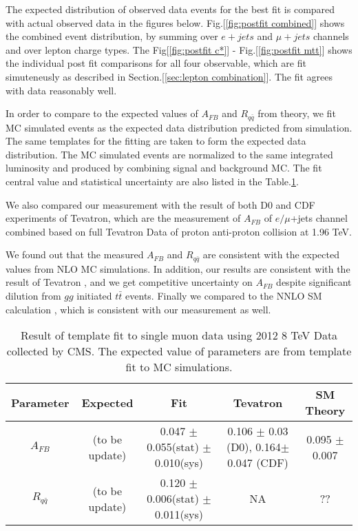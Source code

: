 \documentclass{cmspaperpdf}
\begin{document}
The expected distribution of observed data events for the best fit is compared with actual observed data in the figures below. Fig.[\ref{fig:postfit combined}] shows the combined event distribution, by summing over $e+jets$ and $\mu+jets$ channels and over lepton charge types. The Fig[\ref{fig:postfit c*}] - Fig.[\ref{fig:postfit mtt}] shows the individual post fit comparisons for all four observable, which are fit simuteneusly as described in Section.[\ref{sec:lepton combination}]. The fit agrees with data reasonably well. 

In order to compare to the expected values of $A_{FB}$ and $R_{q\bar{q}}$ from theory, we fit MC simulated events as the expected data distribution predicted from simulation. The same templates for the fitting are taken to form the expected data distribution. The MC simulated events are normalized to the same integrated luminosity and produced by combining signal and background MC. The fit central value and statistical uncertainty are also listed in the Table.\ref{tab:result_mu}.

We also compared our measurement with the result of both D0 and CDF experiments of Tevatron, which are the measurement of $A_{FB}$ of $e/\mu$+jets channel combined based on full Tevatron Data of proton anti-proton collision at 1.96 TeV. 

We found out that the measured $A_{FB}$ and $R_{q\bar{q}}$ are consistent with the expected values from NLO MC simulations. In addition, our results are consistent with the result of Tevatron \cite{d0,CDF2016}, and we get competitive uncertainty on $A_{FB}$ despite significant dilution from $gg$ initiated $t\bar{t}$ events. Finally we compared to the NNLO SM calculation \cite{Czakon:2014xsa}, which is consistent with our measurement as well. 


\begin{table}[hbt]
\begin{center}
\begin{tabular}{c|cccc}\hline
Parameter                 & Expected  & Fit  & Tevatron & SM Theory  \\
\hline
$A_{FB}$					  & (to be update)  &  0.047  $\pm$ 0.055(stat) $\pm$ 0.010(sys) & 0.106 $\pm$ 0.03 (D0), 0.164$\pm$0.047 (CDF)  &  0.095 $\pm$ 0.007\\
$R_{q\bar{q}}$			  & (to be update) &  0.120 $\pm$ 0.006(stat) $\pm$ 0.011(sys) & NA & ?? \\
\end{tabular}
\end{center}
\label{tab:result_mu}
\caption{Result of template fit to single muon data using 2012 8 TeV Data collected by CMS.  The expected value of parameters are from template fit to MC simulations. }
\end{table}
\end{document}
